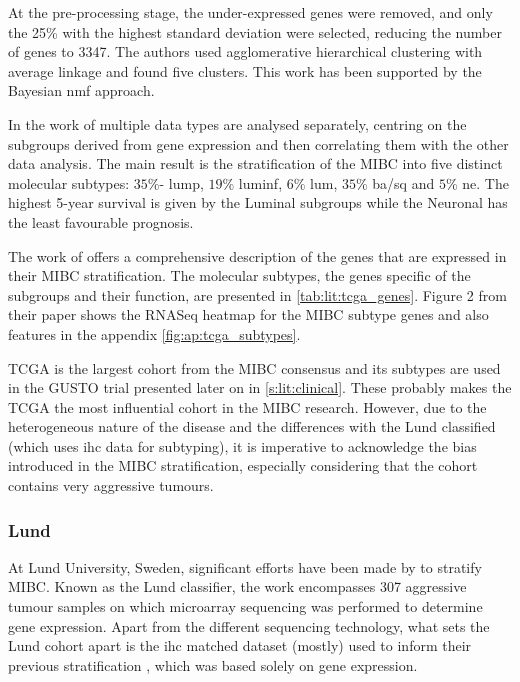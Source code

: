 At the pre-processing stage, the under-expressed genes were removed, and only the 25\% with the highest standard deviation were selected, reducing the number of genes to 3347. The authors used agglomerative hierarchical clustering with average linkage and found five clusters. This work has been supported by the Bayesian \acrfull{nmf} \cite{Schmidt2009-zh} approach.

In the work of \citet{Robertson2017-mg} multiple data types are analysed separately, centring on the subgroups derived from gene expression and then correlating them with the other data analysis. The main result is the stratification of the MIBC into five distinct molecular subtypes: $35\%$- \acrfull{lump}, $19\%$ \acrfull{luminf}, $6\%$ \acrfull{lum}, $35\%$ \acrfull{ba/sq} and $5\%$ \acrfull{ne}. The highest 5-year survival is given by the Luminal subgroups while the Neuronal has the least favourable prognosis. 

The work of \citet{Robertson2017-mg} offers a comprehensive description of the genes that are expressed in their MIBC stratification. The molecular subtypes, the genes specific of the subgroups and their function, are presented in \cref{tab:lit:tcga_genes}. Figure 2 from their paper shows the RNASeq heatmap for the MIBC subtype genes and also features in the appendix \cref{fig:ap:tcga_subtypes}.


TCGA is the largest cohort from the MIBC consensus and its subtypes are used in the GUSTO trial presented later on in \cref{s:lit:clinical}. These probably makes the TCGA the most influential cohort in the MIBC research. However, due to the heterogeneous nature of the disease and the differences with the Lund classified (which uses \acrlong{ihc} data for subtyping), it is imperative to acknowledge the bias introduced in the MIBC stratification, especially considering that the cohort contains very aggressive tumours.

\subsubsection*{Lund} \label{s:lit:lund_mibc}

At Lund University, Sweden, significant efforts have been made by \citet{Sjodahl2017-xr, Marzouka2018-ge} to stratify MIBC. Known as the Lund classifier, the work encompasses 307 aggressive tumour samples on which microarray sequencing was performed to determine gene expression. Apart from the different sequencing technology, what sets the Lund cohort apart is the \acrfull{ihc} matched dataset (mostly) used to inform their previous stratification \citet{Sjodahl2017-xr}, which was based solely on gene expression.

